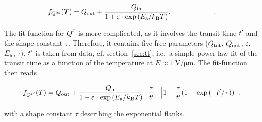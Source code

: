 \begin{equation}
 f_{Q^{\infty}}(T) = \Qo + \frac{\Qin}{1+\varepsilon\cdot\exppEa},\phantom{\frac{\tau}{\ttr}\exp{\left(-\ttr/\tau\right)}}.
 \label{eq:fitQinfty}
\end{equation}

The fit-function for $Q^{t'}$ is more complicated, as it involves the transit time $\mathnormal{t'}$ and the shape constant $\tau$. 
Therefore, it contains five free parameters ($Q_{\textrm{tot}}$, $Q_{\textrm{out}}$, $\varepsilon$, $E_{\textrm{a}}$, $\tau$). %
$\mathnormal{t'}$ is taken from data, cf. section~\ref{sec:tt},
 i.e.~a simple power law fit of the transit time as a function of the temperature at $E \approx \SI{1}{\volt/\micro\meter}$. 
The fit-function then reads

\begin{equation}
 f_{Q^{t'}}(T) = Q_{\textrm{out}} + \frac{Q_{\textrm{in}}}{1+\varepsilon\cdot\exp{\left( E_{\textrm{a}}/k_{\textrm{B}}T \right)}}\cdot \frac{\tau}{\mathnormal{t'}} \cdot \left[ 1 - \frac{\tau}{\mathnormal{t'}} (1 - \exp{\left(-\mathnormal{t'}/\tau\right)}  ) \right] ,
 \label{eq:fitQtprime}
\end{equation}

\noindent
with a shape constant $\tau$ describing the exponential flanks. 

